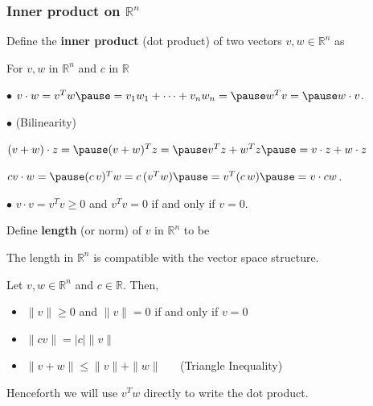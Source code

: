 \documentclass[handout]{beamer}
\newcommand{\BR}{\mbox{$\mathbb R$}}    \newcommand{\BL}{\mbox{$\mathbb L$}}
\begin{document}
\begin{frame} 
\frametitle{Inner product on $\BR^n$} \pause

Define the \textbf{inner product} (dot product) of two vectors $v, w
\in \BR^n$ as \pause {}\pause \smallskip

For $v, w $ in $ \BR^n$ and $c$ in $  \BR$ \pause \smallskip

$\bullet$ $ v\cdot w = v^T w \pause = v_1w_1 + \cdots + v_n w_n  = \pause  w^T v =  \pause w\cdot v $. \pause \smallskip

$\bullet$  (Bilinearity) \pause

\hspace*{.9in} $ (v+w)\cdot z = \pause (v+w)^T z= \pause  v^Tz +w^T z \pause = v\cdot z +w \cdot z$\pause 

\hspace*{.9in} $ cv\cdot w = \pause (c\,v)^Tw= c\,(v^Tw) \pause =v^T(c\,w) \pause = v \cdot cw $. \pause  \smallskip

$\bullet$  $v \cdot v = v^T v  \geq 0$ \pause and $v^T v =0$ if and only if
  \pause $v=0$. \pause  \smallskip

Define {\bf length} (or norm) of $v$ in $\BR^n$ to be    \pause \smallskip

    
The length in $\BR^n$ is compatible with the vector space structure.\pause\smallskip

Let $v, w \in \BR^n$ and $c \in \BR$. \pause Then,

\begin{itemize}
\item $\| v\|\geq 0 $ \pause and $\|v\|=0 $ if and only if $v=0$ \pause
\item $\|cv\| = |c| \|v\| $ \pause
\item $\| v+w \| \leq \|v\| + \|w\|$ \pause ~~ (Triangle Inequality) \pause\smallskip
\end{itemize}


Henceforth we will use $v^T w$ directly to write the dot product. 

\end{frame}
\end{document}
